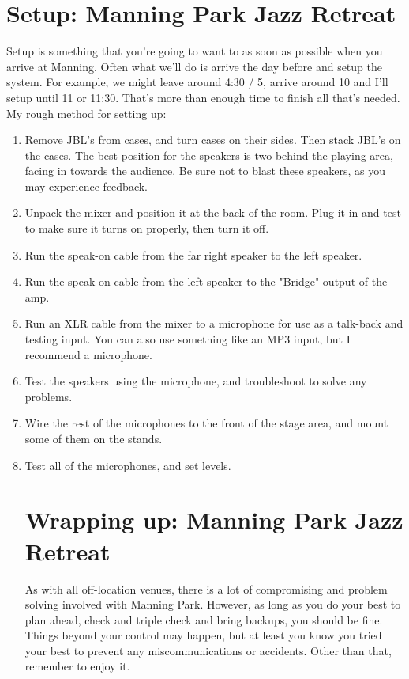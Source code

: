 \documentclass[11pt,a4paper]{book}
\begin{document}
\section{Setup: Manning Park Jazz Retreat} 
Setup is something that you're going to want to as soon as possible when you arrive at Manning. Often what we'll do is arrive the day before and setup the system. For example, we might leave around 4:30 / 5, arrive around 10 and I'll setup until 11 or 11:30. That's more than enough time to finish all that's needed. My rough method for setting up:
\begin{enumerate}
\item Remove JBL's from cases, and turn cases on their sides. Then stack JBL's on the cases. The best position for the speakers is two behind the playing area, facing in towards the audience. Be sure not to blast these speakers, as you may experience feedback.
\item Unpack the mixer and position it at the back of the room. Plug it in and test to make sure it turns on properly, then turn it off.
\item Run the speak-on cable from the far right speaker to the left speaker.
\item Run the speak-on cable from the left speaker to the "Bridge" output of the amp.
\item Run an XLR cable from the mixer to a microphone for use as a talk-back and testing input. You can also use something like an MP3 input, but I recommend a microphone.
\item Test the speakers using the microphone, and troubleshoot to solve any problems.
\item Wire the rest of the microphones to the front of the stage area, and mount some of them on the stands.
\item Test all of the microphones, and set levels.

\section{Wrapping up: Manning Park Jazz Retreat}
As with all off-location venues, there is a lot of compromising and problem solving involved with Manning Park. However, as long as you do your best to plan ahead, check and triple check and bring backups, you should be fine. Things beyond your control may happen, but at least you know you tried your best to prevent any miscommunications or accidents. Other than that, remember to enjoy it.
\end{enumerate}
\end{document}
